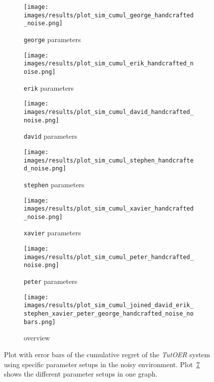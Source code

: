 \begin{figure}[ht]
	\begin{subfigure}{0.48\linewidth}
	\texttt{[image: images/results/plot\_sim\_cumul\_george\_handcrafted\_noise.png]}
	\caption{\texttt{george} parameters}
	\label{fig:cumul_handcrafted_noise_george}
	\end{subfigure}
	\hfill
	\begin{subfigure}{0.48\linewidth}
		\texttt{[image: images/results/plot\_sim\_cumul\_erik\_handcrafted\_noise.png]}
	\caption{\texttt{erik} parameters}
	\label{fig:cumul_handcrafted_noise_erik}
	\end{subfigure}
	\begin{subfigure}{0.48\linewidth}
	\texttt{[image: images/results/plot\_sim\_cumul\_david\_handcrafted\_noise.png]}
	\caption{\texttt{david} parameters}
	\label{fig:cumul_handcrafted_noise_david}
	\end{subfigure}
	\hfill
	\begin{subfigure}{0.48\linewidth}
	\texttt{[image: images/results/plot\_sim\_cumul\_stephen\_handcrafted\_noise.png]}
	\caption{\texttt{stephen} parameters}
	\label{fig:cumul_handcrafted_noise_stephen}
	\end{subfigure}
	\begin{subfigure}{0.48\linewidth}
	\texttt{[image: images/results/plot\_sim\_cumul\_xavier\_handcrafted\_noise.png]}
	\caption{\texttt{xavier} parameters}
	\label{fig:cumul_handcrafted_noise_xavier}
	\end{subfigure}
	\hfill
	\begin{subfigure}{0.48\linewidth}
	\texttt{[image: images/results/plot\_sim\_cumul\_peter\_handcrafted\_noise.png]}
	\caption{\texttt{peter} parameters}
	\label{fig:cumul_handcrafted_noise_peter}
	\end{subfigure}
	\begin{subfigure}{\linewidth}
	\texttt{[image: images/results/plot\_sim\_cumul\_joined\_david\_erik\_stephen\_xavier\_peter\_george\_handcrafted\_noise\_nobars.png]}
	\caption{overview}
	\label{fig:cumul_handcrafted_noise_overview_group1}
	\end{subfigure}
	\caption{Plot with error bars of the cumulative regret of the \emph{TutOER}
	system using specific parameter setups in the noisy environment.
	Plot~\ref{fig:cumul_handcrafted_noise_overview_group1} shows the
	different parameter setups in one graph.}
	\label{fig:cumul_handcrafted_noise_container_group1}
\end{figure}

